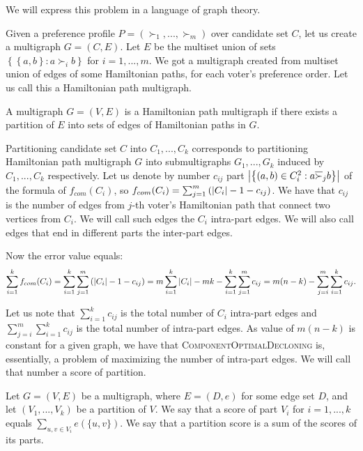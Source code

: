 We will express this problem in a language of graph theory.

Given a preference profile $P = (\succ_1, ..., \succ_m)$ over candidate set $C$,
let us create a multigraph $G=(C,E)$.
Let $E$ be the multiset union of sets
$\left\lbrace \left\lbrace a,b \right\rbrace: a \succ_i b \right\rbrace$ for $i=1, ..., m$.
We got a multigraph created from multiset union of edges of some Hamiltonian paths,
for each voter's preference order.
Let us call this a Hamiltonian path multigraph.

\begin{defn}
A multigraph $G=(V,E)$ is a Hamiltonian path multigraph if there exists a partition of $E$
into sets of edges of Hamiltonian paths in $G$.
\end{defn}

Partitioning candidate set $C$ into $C_1,...,C_k$ corresponds to
partitioning Hamiltonian path multigraph $G$ into submultigraphs $G_1,...,G_k$
induced by $C_1,...,C_k$ respectively.
Let us denote by number $c_{ij}$ part
$\left\vert \left\lbrace \left( a,b \right) \in C_i^2 : a \overline{\succ}_j b \right\rbrace  \right\vert$
of the formula of $f_{com}(C_i)$, so
$f_{com}(C_i) = \sum_{j=1}^m \left( \left\vert C_i \right\vert - 1 - c_{ij} \right)$.
We have that $c_{ij}$ is the number of edges from $j$-th voter's Hamiltonian path
that connect two vertices from $C_i$.
We will call such edges the $C_i$ intra-part edges.
We will also call edges that end in different parts the inter-part edges.

Now the error value equals:
$$
\sum_{i=1}^k f_{com}(C_i) =
\sum_{i=1}^k \sum_{j=1}^m \left( \left\vert C_i \right\vert - 1 - c_{ij} \right) =
m \sum_{i=1}^k \left\vert C_i \right\vert - m k - \sum_{i=1}^k \sum_{j=1}^m c_{ij} =
m(n-k) - \sum_{j=i}^m \sum_{i=1}^k c_{ij}
\text{.}$$

Let us note that $\sum_{i=1}^k c_{ij}$ is the total number of $C_i$ intra-part edges
and $\sum_{j=i}^m \sum_{i=1}^k c_{ij}$ is the total number of intra-part edges.
As value of $m(n-k)$ is constant for a given graph,
we have that \textsc{ComponentOptimalDecloning} is, essentially, a problem of maximizing the number of intra-part edges.
We will call that number a score of partition.

\begin{defn}
Let $G=(V,E)$ be a multigraph, where $E=(D, e)$ for some edge set $D$,
and let $(V_1, ..., V_k)$ be a partition of $V$.
We say that a score of part $V_i$ for $i=1,...,k$ equals $\sum_{u,v \in V_i} e(\{u,v\})$.
We say that a partition score is a sum of the scores of its parts.
\end{defn}

